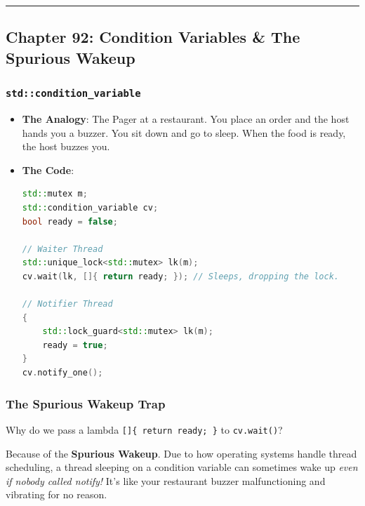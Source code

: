 \begin{center}\rule{0.5\linewidth}{0.5pt}\end{center}

\hypertarget{chapter-92-condition-variables-the-spurious-wakeup}{%
\subsection{Chapter 92: Condition Variables \& The Spurious
Wakeup}\label{chapter-92-condition-variables-the-spurious-wakeup}}

\hypertarget{stdcondition_variable}{%
\subsubsection{\texorpdfstring{\texttt{std::condition\_variable}}{std::condition\_variable}}\label{stdcondition_variable}}

\begin{itemize}
\item
  \textbf{The Analogy}: The Pager at a restaurant. You place an order
  and the host hands you a buzzer. You sit down and go to sleep. When
  the food is ready, the host buzzes you.
\item
  \textbf{The Code}:

\begin{lstlisting}[language={C++}]
std::mutex m;
std::condition_variable cv;
bool ready = false;

// Waiter Thread
std::unique_lock<std::mutex> lk(m);
cv.wait(lk, []{ return ready; }); // Sleeps, dropping the lock.

// Notifier Thread
{
    std::lock_guard<std::mutex> lk(m);
    ready = true;
}
cv.notify_one();
\end{lstlisting}
\end{itemize}

\hypertarget{the-spurious-wakeup-trap}{%
\subsubsection{The Spurious Wakeup
Trap}\label{the-spurious-wakeup-trap}}

Why do we pass a lambda \passthrough{\lstinline![]\{ return ready; \}!}
to \passthrough{\lstinline!cv.wait()!}?

Because of the \textbf{Spurious Wakeup}. Due to how operating systems
handle thread scheduling, a thread sleeping on a condition variable can
sometimes wake up \emph{even if nobody called notify!} It's like your
restaurant buzzer malfunctioning and vibrating for no reason.

